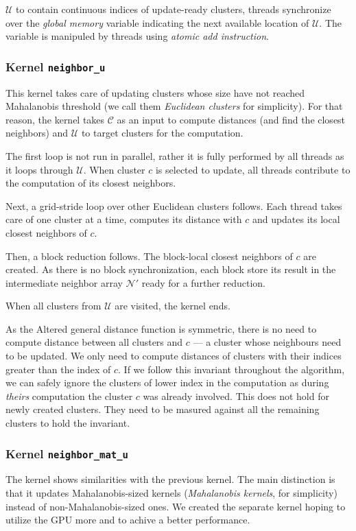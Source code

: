 $\mathcal{U}$ to contain continuous indices of update-ready clusters, threads synchronize over the \emph{global memory} variable indicating the next available location of $\mathcal{U}$. The variable is manipuled by threads using \emph{atomic add instruction}.

\subsubsection{Kernel \texttt{neighbor\_u}}

This kernel takes care of updating clusters whose size have not reached Mahalanobis threshold (we call them \emph{Euclidean clusters} for simplicity). For that reason, the kernel takes $\mathcal{C}$ as an input to compute distances (and find the closest neighbors) and $\mathcal{U}$ to target clusters for the computation.

The first loop is not run in parallel, rather it is fully performed by all threads as it loops through $\mathcal{U}$. When cluster $c$ is selected to update, all threads contribute to the computation of its closest neighbors.

Next, a grid-stride loop over other Euclidean clusters follows. Each thread takes care of one cluster at a time, computes its distance with $c$ and updates its local closest neighbors of $c$.

Then, a block reduction follows. The block-local closest neighbors of $c$ are created. As there is no block synchronization, each block store its result in the intermediate neighbor array $\mathcal{N}'$ ready for a further reduction.

When all clusters from $\mathcal{U}$ are visited, the kernel ends.

\begin{rem}
	As the Altered general distance function is symmetric, there is no need to compute distance between all clusters and $c$ --- a cluster whose neighbours need to be updated. We only need to compute distances of clusters with their indices greater than the index of $c$. If we follow this invariant throughout the algorithm, we can safely ignore the clusters of lower index in the computation as during \emph{theirs} computation the cluster $c$ was already involved. This does not hold for newly created clusters. They need to be masured against all the remaining clusters to hold the invariant.
\end{rem}

\subsubsection{Kernel \texttt{neighbor\_mat\_u}} The kernel shows similarities with the previous kernel. The main distinction is that it updates Mahalanobis-sized kernels (\emph{Mahalanobis kernels}, for simplicity) instead of non-Mahalanobis-sized ones. We created the separate kernel hoping to utilize the GPU more and to achive a better performance.

